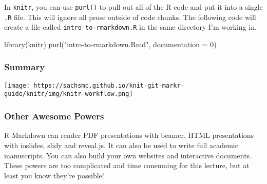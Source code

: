 \documentclass[
]{article}
\newenvironment{Shaded}{\begin{snugshade}}{\end{snugshade}}
\newcommand{\AttributeTok}[1]{\textcolor[rgb]{0.77,0.63,0.00}{#1}}
\newcommand{\DecValTok}[1]{\textcolor[rgb]{0.00,0.00,0.81}{#1}}
\newcommand{\FunctionTok}[1]{\textcolor[rgb]{0.00,0.00,0.00}{#1}}
\newcommand{\NormalTok}[1]{#1}
\newcommand{\StringTok}[1]{\textcolor[rgb]{0.31,0.60,0.02}{#1}}
\begin{document}
In \texttt{knitr}, you can use \texttt{purl()} to pull out all of the R
code and put it into a single \texttt{.R} file. This wiil ignore all
prose outside of code chunks. The following code will create a file
called \texttt{intro-to-rmarkdown.R} in the same directory I'm working
in.

\begin{Shaded}
\begin{Highlighting}[]
\FunctionTok{library}\NormalTok{(knitr)}
\FunctionTok{purl}\NormalTok{(}\StringTok{"intro{-}to{-}rmarkdown.Rmd"}\NormalTok{, }\AttributeTok{documentation =} \DecValTok{0}\NormalTok{)}
\end{Highlighting}
\end{Shaded}

\hypertarget{summary}{%
\subsubsection{Summary}\label{summary}}

\texttt{[image: https://sachsmc.github.io/knit-git-markr-guide/knitr/img/knitr-workflow.png]}

\hypertarget{other-awesome-powers}{%
\subsubsection{Other Awesome Powers}\label{other-awesome-powers}}

R Markdown can render PDF presentations with beamer, HTML presentations
with ioslides, slidy and reveal.js. It can also be used to write full
academic manuscripts. You can also build your own websites and
interactive documents. These powers are too complicated and time
consuming for this lecture, but at least you know they're possible!
\end{document}
